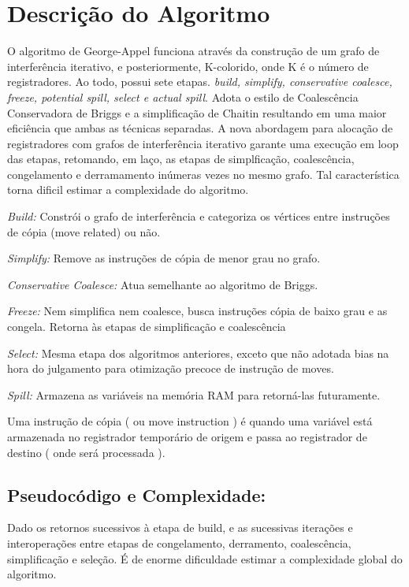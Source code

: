 \section{Descrição do Algoritmo}

O algoritmo de George-Appel funciona através da construção de um grafo de interferência iterativo, e posteriormente, K-colorido, onde K é o número de registradores. Ao todo, possui sete etapas.\textit{ build, simplify, conservative coalesce, freeze, potential spill, select e actual spill}. Adota o estilo de Coalescência Conservadora de Briggs e a simplificação de Chaitin resultando em uma maior eficiência que ambas as técnicas separadas. A nova abordagem para alocação de registradores com grafos de interferência iterativo garante uma execução em loop das etapas, retomando, em laço, as etapas de simplficação, coalescência, congelamento e derramamento inúmeras vezes no mesmo grafo. Tal característica torna dificil estimar a complexidade do algoritmo.



\textit{Build:} Constrói o grafo de interferência e categoriza os vértices entre instruções de cópia (move related) ou não.


\textit{Simplify:}  Remove as instruções de cópia de menor grau no grafo.


\textit{Conservative Coalesce:} Atua semelhante ao algoritmo de Briggs.

\textit{Freeze: } Nem simplifica nem coalesce, busca instruções cópia de baixo grau e as congela. Retorna às etapas de simplificação e coalescência

\textit{Select: } Mesma etapa dos algoritmos anteriores, exceto que não adotada bias na hora do julgamento para otimização precoce de instrução de moves.

\textit{Spill: } Armazena as variáveis na memória RAM para retorná-las futuramente.

Uma instrução de cópia ( ou move instruction ) é quando uma variável está armazenada no registrador temporário de origem e passa ao registrador de destino ( onde será processada ).

\subsection{Pseudocódigo e Complexidade: }

Dado os retornos sucessivos à etapa de build, e as sucessivas iterações e interoperações entre etapas de congelamento, derramento, coalescência, simplificação e seleção. É de enorme dificuldade estimar a complexidade global do algoritmo.

